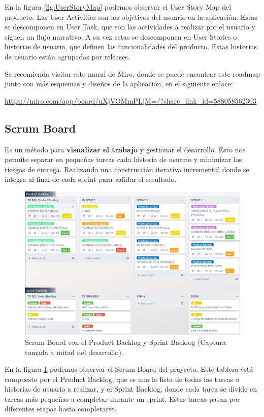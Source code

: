 \documentclass[12pt,twoside,titlepage]{report}
\begin{document}
En la figura \ref{fig:UserStoryMap} podemos observar el User Story Map del producto. 
Las User Activities son los objetivos del usuario en la aplicación. 
Estas se descomponen en User Task, que son las actividades a realizar por el usuario y siguen un flujo narrativo. 
A su vez estas se descomponen en User Stories o historias de usuario, que definen las funcionalidades del producto. 
Estas historias de usuario están agrupadas por releases.  

Se recomienda visitar este mural de Miro, donde se puede encontrar este roadmap junto con más esquemas y diseños de la aplicación, en el siguiente enlace: 

\url{https://miro.com/app/board/uXjVOMmPLjM=/?share_link_id=588058562303}

\subsection{Scrum Board}

Es un método para \textbf{visualizar el trabajo} y gestionar el desarrollo. Esto nos permite separar en pequeñas tareas cada historia de usuario y minimizar los riesgos de entrega. Realizando una construcción iterativa incremental donde se integra al final de cada sprint para validar el resultado. 

\begin{figure}[H]
    \centering
    \includegraphics[scale=0.47]{Scrum/ScrumBoard}
    \caption{Scrum Board con el Product Backlog y Sprint Backlog (Captura tomada a mitad del desarrollo).}
    \label{fig:ScrumBoard}
\end{figure}

En la figura \ref{fig:ScrumBoard} podemos observar el Scrum Board del proyecto. Este tablero está compuesto por el Product Backlog, que es una la lista de todas las tareas o historias de usuario a realizar, y el Sprint Backlog, donde cada tarea se divide en tareas más pequeñas a completar durante un sprint. 
Estas tareas pasan por diferentes etapas hasta completarse.
\end{document}
